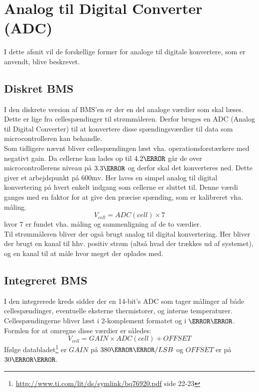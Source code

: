 \section{Analog til Digital Converter (ADC)}
I dette afsnit vil de forskellige former for analoge til digitale konvertere, som er anvendt, blive beskrevet. 

\subsection{Diskret BMS}
I den diskrete version af BMS'en er der en del analoge værdier som skal læses. Dette er lige fra cellespændinger til strømmåleren. Derfor bruges en ADC (Analog til Digital Converter) til at konvertere disse spændingsværdier til data som microcontrolleren kan behandle. \\

Som tidligere nævnt bliver cellespændingen læst vha. operationsforstærkere med negativt gain. Da cellerne kan lades op til $4.2\volt$ går de over microcontrollerens niveau på $3.3\volt$ og derfor skal det konverteres ned.  Dette giver et arbejdspunkt på 600mv. Her laves en simpel analog til digital konvertering på hvert enkelt indgang som cellerne er sluttet til. Denne værdi ganges med en faktor for at give den præcise spænding, som er kalibreret vha. måling. 
\begin {equation}
V_{cell} = ADC(cell) \times 7
\end {equation}
hvor 7 er fundet vha. måling og sammenligning af de to værdier. \\

Til strømmåleren bliver der også brugt analog til digital konvertering. Her bliver der brugt en kanal til hhv. positiv strøm (altså hvad der trækkes ud af systemet), og en kanal til at måle hvor meget der oplades med. 

\subsection{Integreret BMS}
I den integrerede kreds sidder der en 14-bit's ADC som tager målinger af både cellespændinger, eventuelle eksterne thermistorer, og interne temperaturer. Cellespændingerne bliver læst i 2-komplement formatet og i $\milli\volt$. Formlen for at omregne disse værdier er således: 
\begin {equation} 
V_{cell} = GAIN \times ADC(cell) + OFFSET
\end {equation}
Ifølge databladet\footnote{\url{http://www.ti.com/lit/ds/symlink/bq76920.pdf} side 22-23} er $GAIN$ på $380\micro\volt/LSB$ og $OFFSET$ er på $30\milli\volt$. \\

